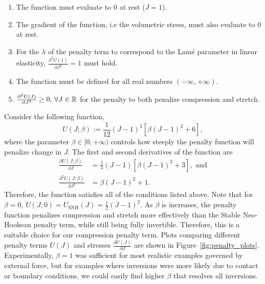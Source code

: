 \begin{enumerate}[label=\alph*)]
	\item The function must evaluate to 0 at rest ($J = 1$).
	\item The gradient of the function, i.e the volumetric stress, must also evaluate to 0 at rest.
	\item For the $\lambda$ of the penalty term to  correspond to the Lam\'e parameter in linear elasticity, $\frac{\partial^2 U(1)}{\partial J^2} = 1$ must hold.
	\item The function must be defined for all real numbers $(-\infty, +\infty)$.
	\item $\frac{\partial^2 U(J)}{\partial J^2} \geq 0, \,\forall J \in \mathbb{R}$ for the penalty to both penalize compression and stretch.
\end{enumerate}

Consider the following function,
\begin{equation}
U(J; \beta) := \frac{1}{12} (J-1)^2 \left[ \beta (J-1)^2 + 6 \right],
\label{eq:penalty_function}
\end{equation}
where the parameter $\beta \in [0, +\infty)$ controls how steeply the penalty function will penalize change in $J$. 
The first and second derivatives of the function are 
\begin{align}
\frac{\partial U(J; \beta)}{\partial J} &= \frac{1}{3} (J-1) \left[ \beta (J-1)^2 + 3 \right], \text{ and}\\
\frac{\partial^2 U(J; \beta)}{\partial J^2} &= \beta (J-1)^2 + 1. 
\label{eq:penalty_derivatives}
\end{align}
Therefore, the function satisfies all of the conditions listed above.    
Note that for $\beta = 0$, $U(J;0) = U_{\text{SNH}}(J) = \frac{1}{2} (J-1)^2$. 
As $\beta$ is increases, the penalty function penalizes compression and stretch more effectively than the Stable
Neo-Hookean penalty term, while still being fully invertible. 
Therefore, this is a suitable choice for our compression penalty term.
Plots comparing different penalty terms $U(J)$ and stresses $\frac{\partial U(J)}{\partial J}$ are shown in Figure~\ref{fig:penalty_plots}.
Experimentally, $\beta = 1$ was sufficient for most realistic examples governed by external force, but for examples where inversions were more likely due to contact or boundary conditions, we could easily find higher $\beta$ that resolves all inversions.


